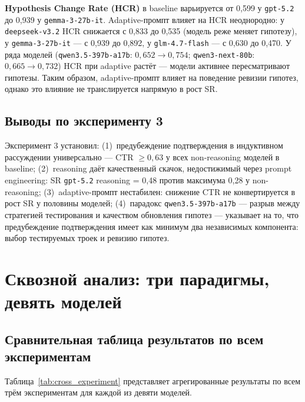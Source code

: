 \textbf{Hypothesis Change Rate (HCR)} в baseline варьируется от 0,599 у \texttt{gpt-5.2} до 0,939 у \texttt{gemma-3-27b-it}. Adaptive-промпт влияет на HCR неоднородно: у \texttt{deepseek-v3.2} HCR снижается с 0,833 до 0,535 (модель реже меняет гипотезу), у \texttt{gemma-3-27b-it} --- с 0,939 до 0,892, у \texttt{glm-4.7-flash} --- с 0,630 до 0,470. У ряда моделей (\texttt{qwen3.5-397b-a17b}: $0{,}652 \to 0{,}754$; \texttt{qwen3-next-80b}: $0{,}665 \to 0{,}732$) HCR при adaptive растёт --- модели активнее пересматривают гипотезы. Таким образом, adaptive-промпт влияет на поведение ревизии гипотез, однако это влияние не транслируется напрямую в рост SR.

\subsection{Выводы по эксперименту 3}

Эксперимент 3 установил: (1)~предубеждение подтверждения в индуктивном рассуждении универсально --- CTR $\geq 0{,}63$ у всех non-reasoning моделей в baseline; (2)~reasoning даёт качественный скачок, недостижимый через prompt engineering: SR \texttt{gpt-5.2} reasoning = 0{,}48 против максимума 0{,}28 у non-reasoning; (3)~adaptive-промпт нестабилен: снижение CTR не конвертируется в рост SR у половины моделей; (4)~парадокс \texttt{qwen3.5-397b-a17b} --- разрыв между стратегией тестирования и качеством обновления гипотез --- указывает на то, что предубеждение подтверждения имеет как минимум два независимых компонента: выбор тестируемых троек и ревизию гипотез.

\section{Сквозной анализ: три парадигмы, девять моделей}

\subsection{Сравнительная таблица результатов по всем экспериментам}

Таблица~\ref{tab:cross_experiment} представляет агрегированные результаты по всем трём экспериментам для каждой из девяти моделей.

